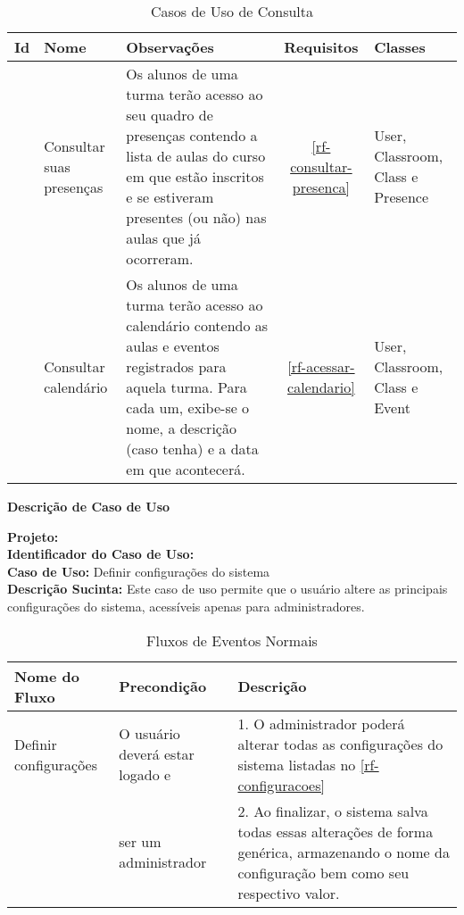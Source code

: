 \begin{table}[H]
	\centering  \vspace{0.5cm} 	\footnotesize 
	\caption{Casos de Uso de Consulta}
	\begin{tabular}{|c|p{2.3cm}|p{6.8cm}|c|p{1.8cm}|} \hline  \rowcolor[rgb]{0.8,0.8,0.8}
		
		Id & Nome   &  Observações & Requisitos   & Classes  \\ 	\hline	
		
		
		\UC\label{uc-consultar-presencas} & Consultar suas presenças & Os alunos de uma turma terão acesso ao seu quadro de presenças contendo a lista de aulas do curso em que estão inscritos e se estiveram presentes (ou não) nas aulas que já ocorreram.  &    \ref{rf-consultar-presenca}        & User, Classroom, Class e Presence\\ \hline
		
		
		\UC\label{uc-consultar-calendario} & Consultar calendário & Os alunos de uma turma terão acesso ao calendário contendo as aulas e eventos registrados para aquela turma. Para cada um, exibe-se o nome, a descrição (caso tenha) e a data em que acontecerá. &   \ref{rf-acessar-calendario}        & User, Classroom, Class e Event	\\ \hline
		
	\end{tabular}
	\label{tabela-khoeus-consulta}
\end{table}

\clearpage
\begin{flushright}    \textbf{Descrição de Caso de Uso}   \end{flushright}         
\noindent \textbf{Projeto:} \imprimirtitulo  \\
\textbf{Identificador do Caso de Uso:} \UC\label{uc-definir-configuracoes} \\
\textbf{Caso de Uso:} Definir configurações do sistema \\
\noindent \textbf{Descrição Sucinta:} Este caso de uso permite que o usuário altere as principais configurações do sistema, acessíveis apenas para administradores.\\

\begin{table}[H]
	\centering \vspace{0.5cm} \footnotesize
	\caption{Fluxos de Eventos Normais}
	\begin{tabular}{|p{2.3cm}|p{2.5cm}|p{10cm}|} \hline  \rowcolor[rgb]{0.8,0.8,0.8}
		
		Nome do Fluxo & Precondição & Descrição  \\ \hline		
		
		Definir configurações & O usuário  deverá estar logado e& 1. O administrador poderá alterar todas as configurações do sistema listadas no \ref{rf-configuracoes}  \\
		{} & ser um administrador & 2. Ao finalizar, o sistema salva todas essas alterações de forma genérica, armazenando o nome da configuração bem como seu respectivo valor.\\ \hline
		
		
	\end{tabular}
\end{table}

